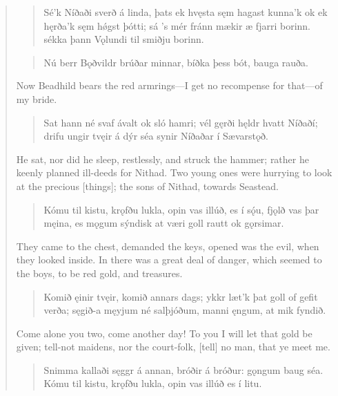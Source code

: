 \begin{verse}
\begin{verse}
\bva Sé'k Níðaði \hld sverð á linda,
þats ek hvęsta \hld sęm hagast kunna'k
ok ek hęrða'k \hld sęm hǿgst þótti;
sá 's mér fránn mækir \hld æ fjarri borinn.
sékka þann Vǫlundi \hld til smiðju borinn. \\%
\end{verse}


\begin{verse}
\bva Nú berr Bǫðvildr \hld brúðar minnar,
bíðka þess bót, \hld bauga rauða. \\%
\end{verse}

\bvb Now Beadhild bears the red armrings—I get no recompense for that—of my bride.

\begin{verse}
\bva Sat hann né svaf ávalt \hld ok sló hamri;
vél gęrði hęldr \hld hvatt Níðaðí;
drifu ungir tvęir \hld á dýr séa
synir Níðaðar \hld í Sævarstǫð. \\%
\end{verse}

\bvb He sat, nor did he sleep, restlessly, and struck the hammer; rather he keenly planned ill-deeds for Nithad. Two young ones were hurrying to look at the precious [things]; the sons of Nithad, towards Seastead.

\begin{verse}
\bva Kómu til kistu, \hld krǫfðu lukla,
opin vas illúð, \hld es í sǫ́u,
fjǫlð vas þar męina, \hld es mǫgum sýndisk
at væri goll rautt \hld ok gǫrsimar. \\%
\end{verse}

\bvb They came to the chest, demanded the keys, opened was the evil, when they looked inside. In there was a great deal of danger, which seemed to the boys, to be red gold, and treasures.

\begin{verse}
\bva Komið ęinir tvęir, \hld komið annars dags;
ykkr læt'k þat goll \hld of gefit verða;
sęgið-a męyjum \hld né salþjóðum,
manni ęngum, \hld at mik fyndið. \\%
\end{verse}

\bvb Come alone you two, come another day! To you I will let that gold be given; tell-not maidens, nor the court-folk, [tell] no man, that ye meet me.

\begin{verse}
\bva Snimma kallaði \hld sęggr á annan,
bróðir á bróður: \hld gǫngum baug séa.
Kómu til kistu, \hld krǫfðu lukla,
opin vas illúð \hld es í litu. \\%
\end{verse}


\end{verse}
